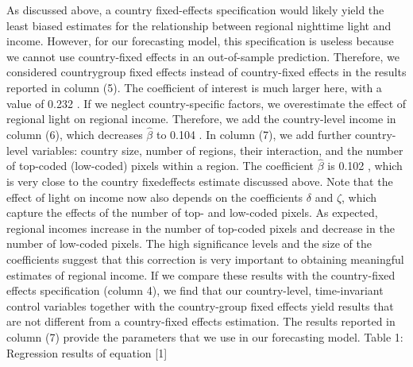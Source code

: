 \documentclass[10pt]{article}
\begin{document}
As discussed above, a country fixed-effects specification would likely yield the least biased estimates for the relationship between regional nighttime light and income. However, for our forecasting model, this specification is useless because we cannot use country-fixed effects in an out-of-sample prediction. Therefore, we considered countrygroup fixed effects instead of country-fixed effects in the results reported in column (5). The coefficient of interest is much larger here, with a value of 0.232 . If we neglect country-specific factors, we overestimate the effect of regional light on regional income. Therefore, we add the country-level income in column (6), which decreases $\hat{\beta}$ to 0.104 . In column (7), we add further country-level variables: country size, number of regions, their interaction, and the number of top-coded (low-coded) pixels within a region. The coefficient $\hat{\beta}$ is 0.102 , which is very close to the country fixedeffects estimate discussed above. Note that the effect of light on income now also depends on the coefficients $\delta$ and $\zeta$, which capture the effects of the number of top- and low-coded pixels. As expected, regional incomes increase in the number of top-coded pixels and decrease in the number of low-coded pixels. The high significance levels and the size of the coefficients suggest that this correction is very important to obtaining meaningful estimates of regional income. If we compare these results with the country-fixed effects specification (column 4), we find that our country-level, time-invariant control variables together with the country-group fixed effects yield results that are not different from a country-fixed effects estimation. The results reported in column (7) provide the parameters that we use in our forecasting model. Table 1: Regression results of equation [1]
\end{document}
